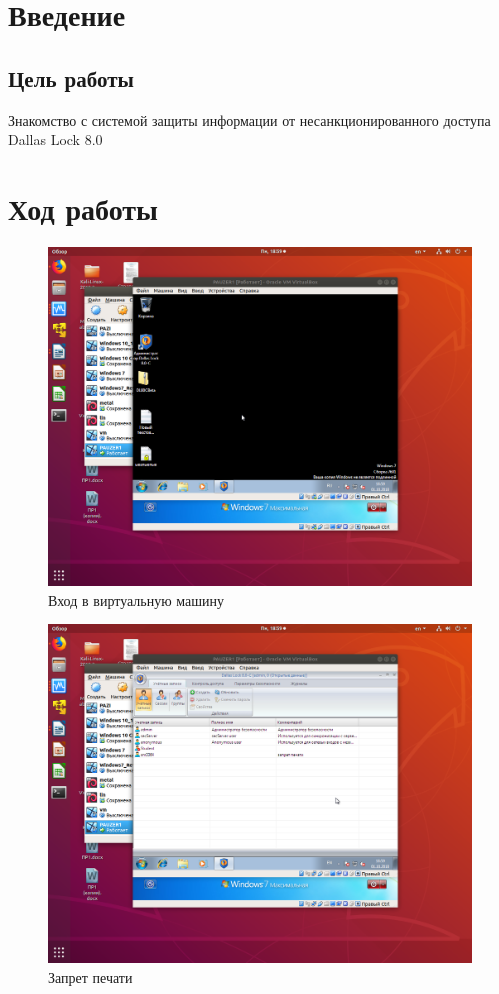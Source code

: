 \chapter{Введение}

\section{Цель работы}

Знакомство с системой защиты информации от несанкционированного доступа Dallas Lock 8.0


\chapter{Ход работы}

\begin{figure}[H]
	\centering
	\includegraphics[width=.8\textwidth]{images/1.png}
	\caption{Вход в виртуальную машину}
\end{figure}

\begin{figure}[H]
	\centering
	\includegraphics[width=.8\textwidth]{images/2.png}
	\caption{Запрет печати}
\end{figure}

